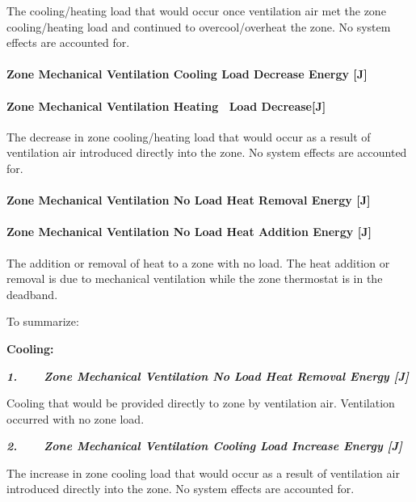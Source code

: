 The cooling/heating load that would occur once ventilation air met the zone cooling/heating load and continued to overcool/overheat the zone. No system effects are accounted for.

\paragraph{Zone Mechanical Ventilation Cooling Load Decrease Energy {[}J{]}}\label{zone-mechanical-ventilation-cooling-load-decrease-energy-j}

\paragraph{Zone Mechanical Ventilation Heating~ Load Decrease{[}J{]}}\label{zone-mechanical-ventilation-heating-load-decreasej}

The decrease in zone cooling/heating load that would occur as a result of ventilation air introduced directly into the zone. No system effects are accounted for.

\paragraph{Zone Mechanical Ventilation No Load Heat Removal Energy {[}J{]}}\label{zone-mechanical-ventilation-no-load-heat-removal-energy-j}

\paragraph{Zone Mechanical Ventilation No Load Heat Addition Energy {[}J{]}}\label{zone-mechanical-ventilation-no-load-heat-addition-energy-j}

The addition or removal of heat to a zone with no load. The heat addition or removal is due to mechanical ventilation while the zone thermostat is in the deadband.

To summarize:

\textbf{Cooling:}

\textbf{\emph{1.~~~~Zone Mechanical Ventilation No Load Heat Removal Energy {[}J{]}}}

Cooling that would be provided directly to zone by ventilation air. Ventilation occurred with no zone load.

\textbf{\emph{2.~~~~Zone Mechanical Ventilation Cooling Load Increase Energy {[}J{]}}}

The increase in zone cooling load that would occur as a result of ventilation air introduced directly into the zone. No system effects are accounted for.


